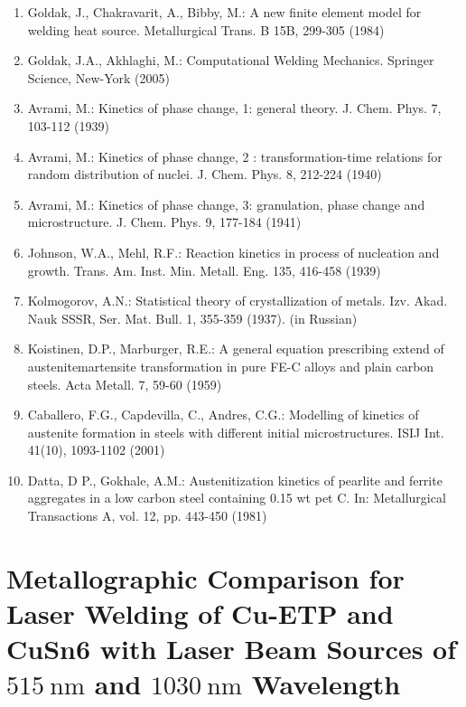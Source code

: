 \documentclass[10pt]{article}
\begin{document}
\begin{enumerate}
  \item Goldak, J., Chakravarit, A., Bibby, M.: A new finite element model for welding heat source. Metallurgical Trans. B 15B, 299-305 (1984)

  \item Goldak, J.A., Akhlaghi, M.: Computational Welding Mechanics. Springer Science, New-York (2005)

  \item Avrami, M.: Kinetics of phase change, 1: general theory. J. Chem. Phys. 7, 103-112 (1939)

  \item Avrami, M.: Kinetics of phase change, 2 : transformation-time relations for random distribution of nuclei. J. Chem. Phys. 8, 212-224 (1940)

  \item Avrami, M.: Kinetics of phase change, 3: granulation, phase change and microstructure. J. Chem. Phys. 9, 177-184 (1941)

  \item Johnson, W.A., Mehl, R.F.: Reaction kinetics in process of nucleation and growth. Trans. Am. Inst. Min. Metall. Eng. 135, 416-458 (1939)

  \item Kolmogorov, A.N.: Statistical theory of crystallization of metals. Izv. Akad. Nauk SSSR, Ser. Mat. Bull. 1, 355-359 (1937). (in Russian)

  \item Koistinen, D.P., Marburger, R.E.: A general equation prescribing extend of austenitemartensite transformation in pure FE-C alloys and plain carbon steels. Acta Metall. 7, 59-60 (1959)

  \item Caballero, F.G., Capdevilla, C., Andres, C.G.: Modelling of kinetics of austenite formation in steels with different initial microstructures. ISIJ Int. 41(10), 1093-1102 (2001)

  \item Datta, D P., Gokhale, A.M.: Austenitization kinetics of pearlite and ferrite aggregates in a low carbon steel containing 0.15 wt pet C. In: Metallurgical Transactions A, vol. 12, pp. 443-450 (1981)

\end{enumerate}

\section*{Metallographic Comparison for Laser Welding of Cu-ETP and CuSn6 with Laser Beam Sources of $515 \mathrm{~nm}$ and $1030 \mathrm{~nm}$ Wavelength }
\end{document}

